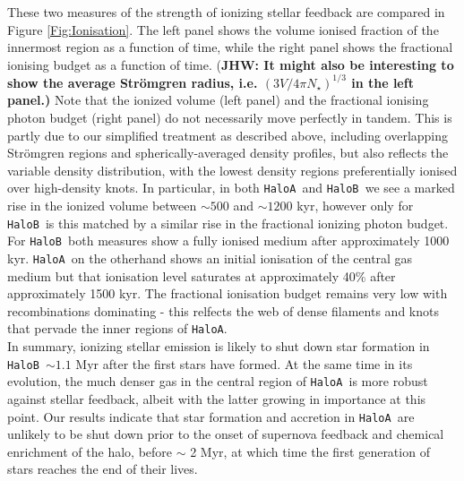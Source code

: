 \documentclass[graphics, twocolumn, usenatbib]{mn2e}
\newcommand{\ha} {\texttt{HaloA~}}
\newcommand{\hb} {\texttt{HaloB~}}
\newcommand{\hac} {\texttt{HaloA}}
\newcommand{\jhw}[1]{{\color{Maroon} (\bf JHW: #1)}}
\begin{document}
These two measures of the strength of ionizing stellar feedback are compared in Figure \ref{Fig:Ionisation}. The left panel shows the volume ionised fraction of the innermost region as a function of time, while the right panel shows
the fractional ionising budget as a function of time.  \jhw{It might also be interesting to show the average Str{\"o}mgren radius, i.e. $(3V/4\pi N_\star)^{1/3}$ in the left panel.} Note that the ionized volume (left panel) and the fractional ionising photon budget (right panel) do not necessarily
move perfectly in tandem. This is partly due to our simplified treatment as described above, including overlapping Str{\" o}mgren regions and spherically-averaged density profiles, but also
reflects the variable density distribution, with the lowest density regions preferentially ionised over high-density knots. In particular, in both \ha and \hb we see a marked rise in the
ionized volume between $\sim 500$ and $\sim1200$ kyr, however only for \hb is this matched by a similar rise in the fractional ionizing photon budget. For \hb both measures show a fully ionised medium
after approximately 1000 kyr. \ha on the otherhand shows an initial ionisation of the central gas medium but that ionisation level saturates at approximately 40\% after approximately 1500 kyr. The fractional
ionisation budget remains very low with recombinations dominating - this relfects the web of dense filaments and knots that pervade the inner regions of \hac. \\
\indent In summary, ionizing stellar emission is likely to shut down star formation in \hb $\sim 1.1$ Myr after the first stars have formed. At the same time in its evolution, the much denser gas in the central region of \ha is more robust against stellar feedback, albeit with the latter growing in importance at this point. Our results indicate that star formation and accretion in \ha are unlikely to be shut down prior to the onset of supernova feedback and chemical enrichment of the halo, before $\sim$ 2 Myr, at which time the first generation of stars reaches the end of their lives. 
\end{document}
